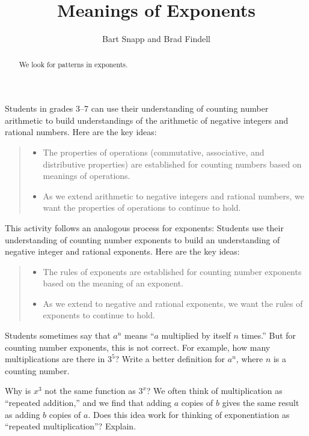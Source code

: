 \documentclass[nooutcomes]{ximera}
\title{Meanings of Exponents}
\author{Bart Snapp and Brad Findell}
\begin{document}
\begin{abstract}
  We look for patterns in exponents.
\end{abstract}
\maketitle

\label{A:MeaningsOfExponents}

Students in grades 3--7 can use their understanding of counting number
arithmetic to build understandings of the arithmetic of negative
integers and rational numbers.  Here are the key ideas:
\begin{quote}
\begin{itemize}
\item The properties of operations (commutative, associative, and
  distributive properties) are established for counting numbers based
  on meanings of operations.
\item As we extend arithmetic to negative integers and rational
  numbers, we want the properties of operations to continue to hold.
\end{itemize}
\end{quote}

This activity follows an analogous process for exponents: Students use
their understanding of counting number exponents to build an
understanding of negative integer and rational exponents.  Here are
the key ideas:
\begin{quote}
\begin{itemize}
\item The rules of exponents are established for counting number
  exponents based on the meaning of an exponent.
\item As we extend to negative and rational exponents, we want the
  rules of exponents to continue to hold.
\end{itemize}
\end{quote}

\begin{problem}
Students sometimes say that $a^n$ means ``$a$ multiplied by itself $n$
times.''  But for counting number exponents, this is not correct.  For
example, how many multiplications are there in $3^5$?  Write a better
definition for $a^n$, where $n$ is a counting number.
\end{problem}

\begin{problem}
Why is $x^3$ not the same function as $3^x$?  We often think of
multiplication as ``repeated addition,'' and we find that adding $a$
copies of $b$ gives the same result as adding $b$ copies of $a$.  Does
this idea work for thinking of exponentiation as ``repeated
multiplication''?  Explain.
\end{problem}
\end{document}
